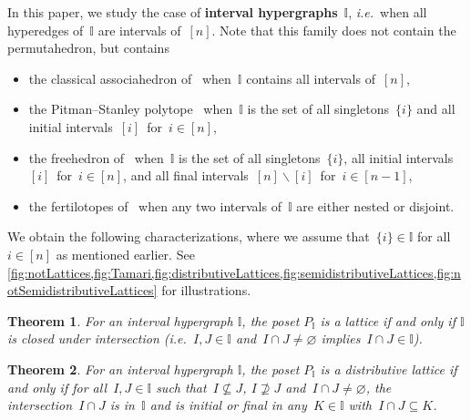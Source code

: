 \documentclass[reqno]{amsart}
\newtheorem{theoremA}{Theorem}
\theoremstyle{definition}
\newcommand{\ssm}{\smallsetminus} %
\newcommand{\ie}{\textit{i.e.}~} %
\newcommand{\defn}[1]{\textbf{\textsf{\color{PineGreen} #1}}} %
\newcommand{\II}{\mathbb I} %
\begin{document}
In this paper, we study the case of \defn{interval hypergraphs}~$\II$, \ie when all hyperedges of~$\II$ are intervals of~$[n]$.
Note that this family does not contain the permutahedron, but contains
\begin{itemize}
\item the classical associahedron of~\cite{ShniderSternberg,Loday} when~$\II$ contains all intervals of~$[n]$,
\item the Pitman--Stanley polytope~\cite{PitmanStanley} when~$\II$ is the set of all singletons~$\{i\}$ and all initial intervals~$[i]$~for~${i \in [n]}$,
\item the freehedron of~\cite{Saneblidze-freehedron} when~$\II$ is the set of all singletons~$\{i\}$, all initial intervals~$[i]$~for~${i \in [n]}$, and all final intervals~$[n] \ssm [i]$~for~${i \in [n-1]}$,
\item the fertilotopes of~\cite{Defant-fertilitopes} when any two intervals of~$\II$ are either nested or disjoint.
\end{itemize}
We obtain the following characterizations, where we assume that~$\{i\} \in \II$ for all~$i \in [n]$ as mentioned earlier.
See \cref{fig:notLattices,fig:Tamari,fig:distributiveLattices,fig:semidistributiveLattices,fig:notSemidistributiveLattices} for illustrations.

\begin{theoremA}
\label{thm:latticeI}
For an interval hypergraph $\II$, the poset $P_\II$ is a lattice if and only if $\II$ is closed under intersection (\ie $I, J \in \II$ and~$I \cap J \ne \varnothing$ implies~$I \cap J \in \II$).
\end{theoremA}

\begin{theoremA}
\label{thm:distributiveLatticeI}
For an interval hypergraph $\II$, the poset $P_\II$ is a distributive lattice if and only if for all~$I, J \in \II$ such that~$I \not\subseteq J$, $I \not\supseteq J$ and~$I \cap J \ne \varnothing$, the intersection~$I \cap J$ is in~$\II$ and is initial or final in any~$K \in \II$ with~$I \cap J \subseteq K$.
\end{theoremA}
\end{document}
